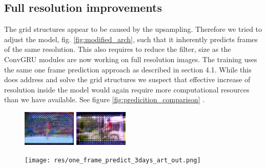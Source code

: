\documentclass[runningheads,a4paper]{llncs}
\begin{document}
\subsection{Full resolution improvements}
The grid structures appear to be caused by the upsampling. Therefore we tried to adjust the model, fig. \ref{fig:modified_arch}, such that it inherently predicts frames of the same resolution. This also requires to reduce the filter, size as the ConvGRU modules are now working on full resolution images. The training uses the same one frame prediction approach as described in section 4.1. While this does address and solve the grid structures we suspect that effective increase of resolution inside the model would again require more computational resources than we have available. See figure \ref{fig:predicition_comparison} .
\begin{figure}[!tbp]
  \centering
  \begin{minipage}[b]{0.2\textwidth}
    \includegraphics[width=\textwidth]{res/artifact_nearest.png}
  \end{minipage}
  \hfill
  \begin{minipage}[b]{0.2\textwidth}
    \includegraphics[width=\textwidth]{res/artifacts_shuffle.png}
  \end{minipage}
  \hfill
  \begin{minipage}[b]{0.55\textwidth}
    \texttt{[image: res/one\_frame\_predict\_3days\_art\_out.png]}
  \end{minipage}
  

\end{figure}
\end{document}
